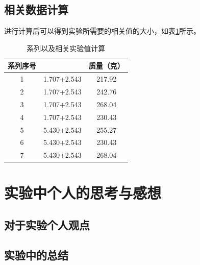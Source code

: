 \documentclass{ctexart}
\begin{document}
  \subsection{相关数据计算}
  进行计算后可以得到实验所需要的相关值的大小，如表\ref{jisuan}所示。

  \begin{table}[H]
    \centering   
    \caption{系列以及相关实验值计算}\label{jisuan}
    \begin{tabular}{| c || c || c |}
        \hline
        系列序号 &  & 质量（克）\\
        \hline
        1 & 1.707+2.543 & 217.92\\
        \hline
        2 & 1.707+2.543 & 242.76\\
        \hline
        3 & 1.707+2.543 & 268.04\\
        \hline
        4 & 1.707+2.543 & 230.43\\
        \hline
        5 & 5.430+2.543 & 255.27\\
        \hline   
        6 & 5.430+2.543 & 230.43\\
        \hline
        7 & 5.430+2.543 & 268.04\\
        \hline                             
    \end{tabular}
  \end{table}
\newpage


\section{实验中个人的思考与感想}
  \subsection{对于实验个人观点}
  
  \subsection{实验中的总结}
  
\end{document}
